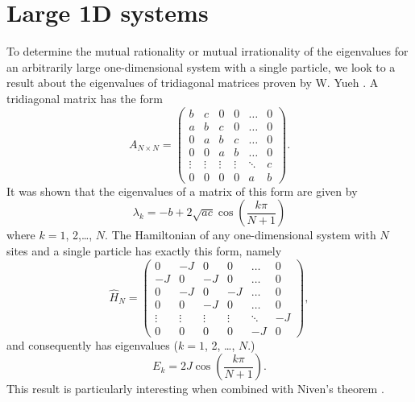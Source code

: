 \documentclass[a4paper,10pt]{article}
\theoremstyle{plain}
\begin{document}
\section{Large 1D systems}

To determine the mutual rationality or mutual irrationality of the eigenvalues for
an arbitrarily large one-dimensional system with a single particle, we look to a
result about the eigenvalues of tridiagonal matrices proven by W. Yueh
\cite{Yueh2006}. A tridiagonal matrix has the form
\begin{equation}
    A_{N \times N}
    =
    \begin{pmatrix}
             b &      c &     0  &      0 &  \dots & 0 \\
             a &      b &     c  &      0 &  \dots & 0 \\
             0 &      a &     b  &      c &  \dots & 0 \\
             0 &      0 &     a  &      b &  \dots & 0 \\
        \vdots & \vdots & \vdots & \vdots & \ddots & c \\
             0 &      0 &     0  &      0 &      a & b
    \end{pmatrix}.
\end{equation}
It was shown that the eigenvalues of a matrix of this form are given by
\begin{equation}
    \lambda_{k} = -b + 2 \sqrt{ac} \cos{\!\left( \frac{k \pi}{N+1} \right )}
\end{equation}
where $k=1$, 2,\dots, $N$. The Hamiltonian of any one-dimensional system with
$N$ sites and a single particle has exactly this form, namely
\begin{equation}
    \hat{H}_{N}
    =
    \begin{pmatrix}
         0 &     -J &     0  &      0 &  \dots &  0 \\
        -J &      0 &    -J  &      0 &  \dots &  0 \\
         0 &     -J &     0  &     -J &  \dots &  0 \\
         0 &      0 &    -J  &      0 &  \dots &  0 \\
    \vdots & \vdots & \vdots & \vdots & \ddots & -J \\
         0 &      0 &     0  &      0 &     -J &  0
    \end{pmatrix},
\end{equation}
and consequently has eigenvalues ($k=1$, 2, \dots, $N$.)
\begin{equation}
    \label{1D_eigenvalues}
    E_{k} = 2 J \cos{\!\left( \frac{k \pi}{N+1} \right)}.
\end{equation}
This result is particularly interesting when combined with Niven's theorem
\cite{DoubleIvan}.
\end{document}
